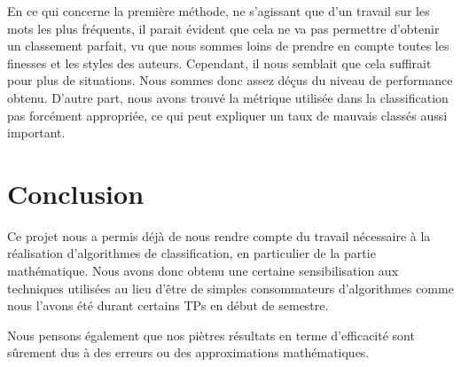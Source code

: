 \documentclass[a4paper,12pt]{report}
\begin{document}

En ce qui concerne la première méthode, ne s'agissant que d'un travail sur les mots les plus fréquents, il parait évident que cela ne va pas permettre d'obtenir un classement parfait, vu que nous sommes loins de prendre en compte toutes les finesses et les styles des auteurs. Cependant, il nous semblait que cela suffirait pour plus de situations. Nous sommes donc assez déçus du niveau de performance obtenu. D'autre part, nous avons trouvé la métrique utilisée dans la classification pas forcément appropriée, ce qui peut expliquer un taux de mauvais classés aussi important.


\section*{Conclusion}

Ce projet nous a permis déjà de nous rendre compte du travail nécessaire à la réalisation d'algorithmes de classification, en particulier de la partie mathématique. Nous avons donc obtenu une certaine sensibilisation aux techniques utilisées au lieu d'être de simples consommateurs d'algorithmes comme nous l'avons été durant certains TPs en début de semestre. 

Nous pensons également que nos piètres résultats en terme d'efficacité sont sûrement dus à des erreurs ou des approximations mathématiques. 
\end{document}
